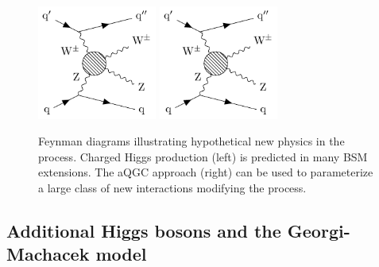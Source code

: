 \begin{figure}[htbp]
  \centering
   \includegraphics[page=1,width=0.35\textwidth]{figures/FeynmanDiagrams/feynmanNP.pdf}
   \includegraphics[page=2,width=0.35\textwidth]{figures/FeynmanDiagrams/feynmanNP.pdf}
  \caption[Feynman diagrams illustrating hypothetical new physics in the \EWWZ process]{
    Feynman diagrams illustrating hypothetical new physics in the \EWWZ process.
    Charged Higgs production (left) is predicted in many BSM extensions. The aQGC
    approach (right) can be used to parameterize a large class of new interactions modifying the
    \WWZZ process.
        }
 \label{fig:feynmanNP}
\end{figure}

\subsection{Additional Higgs bosons and the Georgi-Machacek model}

